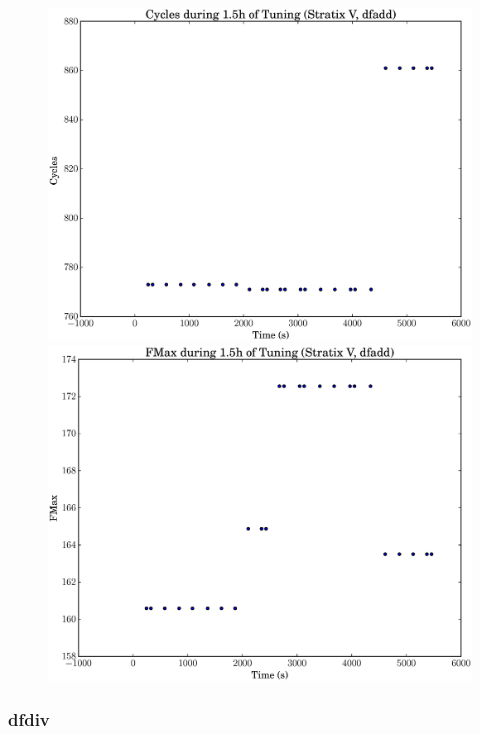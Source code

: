 \documentclass[12pt, a4paper]{article}
\begin{document}
\begin{figure}[htpb]
    \begin{minipage}{.48\textwidth}
        \includegraphics[scale=.25]{dfadd_cycles_5400_chstone_StratixV}
    \end{minipage}%
    \hfill
    \begin{minipage}{.48\textwidth}
        \includegraphics[scale=.25]{dfadd_fmax_5400_chstone_StratixV}
    \end{minipage}%
\end{figure}

\newpage

\subsubsection{dfdiv}
\end{document}

